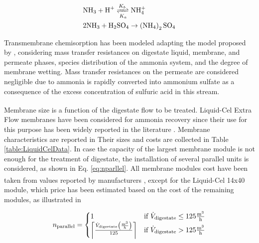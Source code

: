 \begin{refsection}[referencesCh6]
\begin{align}
	& \text{NH}_3 + \text{H}^+ \xrightleftharpoons[K_a]{K_b} \text{NH}_4^+\label{eq:NH3NH4}
	\\
	& 2\text{NH}_3 + \text{H}_2\text{SO}_4 \rightarrow \left(\text{NH}_4\right)_{2}\text{SO}_4  \label{eq:AmmoniumSulfate}  %
\end{align}


Transmembrane chemisorption has been modeled adapting the model proposed by \citet{rongwong2020}, considering mass transfer resistances on digestate liquid, membrane, and permeate phases, species distribution of the ammonia system, and the degree of membrane wetting. Mass transfer resistances on the permeate are considered negligible due to ammonia is rapidly converted into ammonium sulfate as a consequence of the excess concentration of sulfuric acid in this stream.

Membrane size is a function of the digestate flow to be treated. Liquid-Cel\textsuperscript{\texttrademark} Extra Flow membranes \citep{LiquidCelData} have been considered for ammonia recovery since their use for this purpose has been widely reported in the literature \citep{darestani2017hollow, rongwong2020, linstrom2001}. Membrane characteristics are reported in {} Their sizes and costs
are collected in Table \ref{table:LiquidCelData}.
In case the capacity of the largest membrane module is not enough for the treatment of digestate, the installation of several parallel units is considered, as shown in Eq. \ref{eq:nparllel}. All membrane modules cost have been taken from values reported by manufacturers \citep{SGProjects, DPCWaterSolutions}, except for the Liquid-Cel\textsuperscript{\texttrademark} 14x40 module, which price has been estimated based on the cost of the remaining modules, as illustrated in {}

\begin{align}
n_{\text{parallel}} =
\begin{cases}
1 & \text{if } \dot{V}_{\text{digestate}} \leq 125 \frac{\text{m}^3}{\text{h}}  \\
\ceil*{\frac{\dot{V}_{\text{digestate}} \left(\frac{\text{m}^3}{h}\right)}{125}} & \text{if } \dot{V}_{\text{digestate}} > 125 \frac{\text{m}^3}{\text{h}}
\end{cases} \label{eq:nparllel}
\end{align}


\end{refsection}
